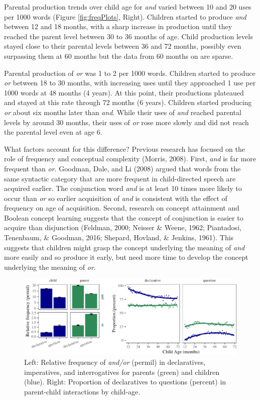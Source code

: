 \documentclass[
  ,man,floatsintext]{apa6}
\begin{document}
Parental production trends over child age for \emph{and} varied between 10 and 20 uses per 1000 words (Figure \ref{fig:freqPlots}, Right). Children started to produce \emph{and} between 12 and 18 months, with a sharp increase in production until they reached the parent level between 30 to 36 months of age. Child production levels stayed close to their parental levels between 36 and 72 months, possibly even surpassing them at 60 months but the data from 60 months on are sparse.

Parental production of \emph{or} was 1 to 2 per 1000 words. Children started to produce \emph{or} between 18 to 30 months, with increasing uses until they approached 1 use per 1000 words at 48 months (4 years). At this point, their productions plateaued and stayed at this rate through 72 months (6 years). Children started producing \emph{or} about six months later than \emph{and}. While their uses of \emph{and} reached parental levels by around 30 months, their uses of \emph{or} rose more slowly and did not reach the parental level even at age 6.

What factors account for this difference? Previous research has focused on the role of frequency and conceptual complexity (Morris, 2008). First, \emph{and} is far more frequent than \emph{or}. Goodman, Dale, and Li (2008) argued that words from the same syntactic category that are more frequent in child-directed speech are acquired earlier. The conjunction word \emph{and} is at least 10 times more likely to occur than \emph{or} so earlier acquisition of \emph{and} is consistent with the effect of frequency on age of acquisition. Second, research on concept attainment and Boolean concept learning suggests that the concept of conjunction is easier to acquire than disjunction (Feldman, 2000; Neisser \& Weene, 1962; Piantadosi, Tenenbaum, \& Goodman, 2016; Shepard, Hovland, \& Jenkins, 1961). This suggests that children might grasp the concept underlying the meaning of \emph{and} more easily and so produce it early, but need more time to develop the concept underlying the meaning of \emph{or}.

\begin{figure}[H]

{\centering \includegraphics{figs/speechActPlots-1} 

}

\caption{Left: Relative frequency of \textit{and/or} (permil) in declaratives, imperatives, and interrogatives for parents (green) and children (blue). Right: Proportion of declaratives to questions (percent) in parent-child interactions by child-age.}\label{fig:speechActPlots}
\end{figure}
\end{document}
